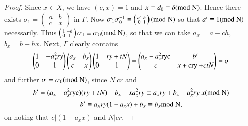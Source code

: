\begin{proof}
Since $x\in X$, we have $(c,x)=1$ and $x\equiv d_{0}\equiv \delta(\rm{mod} \;
N)$. Hence there exists $\sigma_{1}=\left(\begin{smallmatrix} a &
  b\\ c & x\end{smallmatrix}\right)$ in $\Gamma$. Now
  $\sigma_{1}\sigma^{-1}_{0}\equiv \left(\begin{smallmatrix} a' & h\\ 0
    & 1  \end{smallmatrix}\right)(\rm{mod} \; N)$ so that $a'\equiv 1(\rm{mod} \; N)$
  necessarily. Thus $\left(\begin{smallmatrix} 1 & -h\\ 0 & 1
  \end{smallmatrix}\right)\sigma_{1}\equiv \sigma_{0}(\rm{mod} \; N)$, so
  that we can take $a_{x}=a-ch$, $b_{x}=b-hx$. Next, $\Gamma$ clearly
  contains
$$
\begin{pmatrix}
1 & -a^{2}_{x}ry\\ 0 & 1
\end{pmatrix}
\begin{pmatrix}
a_{x} & b_{x}\\
c & x
\end{pmatrix}
\begin{pmatrix}
1 & ry+tN\\
0 & 1
\end{pmatrix}
=
\begin{pmatrix}
a_{x}-a^{2}_{x}\text{ryc} & b'\\
c & x+\operatorname{cry}+ctN
\end{pmatrix}
=\sigma
$$
and further $\sigma=\sigma_{0}(\rm{mod} \; N)$, since $N|cr$ and
$$
b'=(a_{x}-a^{2}_{x}\text{ryc})(ry+tN)+b_{x}-xa^{2}_{x}ry\equiv
a_{x}ry+b_{x}-a^{2}_{x}ry\ x(\rm{mod} \; N)
$$
\ie
$$
b'\equiv a_{x}ry (1-a_{x}x)+b_{x}\equiv b_{x}\rm{mod} \; N,
$$
on noting that $c|(1-a_{x}x)$ and $N|cr$.
\end{proof}


